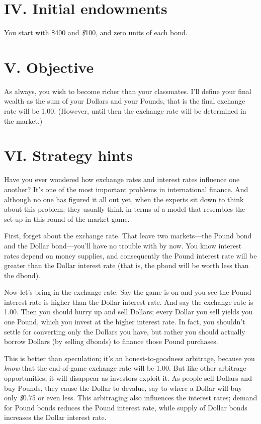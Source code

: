 \section{IV. Initial endowments}%
You start with \$400 and {\it\$}100, and zero units of each bond.

\section{V. Objective}%
As always, you wish to become richer than your classmates.  I'll
define your final wealth as the sum of your Dollars and your Pounds,
that is the final exchange rate will be 1.00.  (However, until then
the exchange rate will be determined in the market.)

\section{VI. Strategy hints}%
Have you ever wondered how exchange rates and interest rates
influence one another?  It's one of the most important problems in
international finance.  And although no one has figured it all out
yet, when the experts sit down to think about this problem, they
usually think in terms of a model that resembles the set-up in this
round of the market game.

First, forget about the exchange rate.  That leave two markets---the
Pound bond and the Dollar bond---you'll have no trouble with by now.
You know interest rates depend on money supplies, and consequently
the Pound interest rate will be greater than the Dollar interest rate
(that is, the pbond will be worth less than the dbond).

Now let's bring in the exchange rate.  Say the game is on and you see
the Pound interest rate is higher than the Dollar interest rate.  And
say the exchange rate is 1.00.  Then you should hurry up and sell
Dollars; every Dollar you sell yields you one Pound, which you invest
at the higher interest rate.  In fact, you shouldn't settle for
converting only the Dollars you have, but rather you should actually
borrow Dollars (by selling dbonds) to finance those Pound purchases.

This is better than speculation; it's an honest-to-goodness
arbitrage, because you {\it know} that the end-of-game exchange rate
will be 1.00.  But like other arbitrage opportunities, it will
disappear as investors exploit it.  As people sell Dollars and buy
Pounds, they cause the Dollar to devalue, say to where a Dollar will buy
only {\it\$}0.75 or even less.  This arbitraging also influences the
interest rates; demand for Pound bonds reduces the Pound interest rate,
while supply of Dollar bonds increases the Dollar interest rate.

